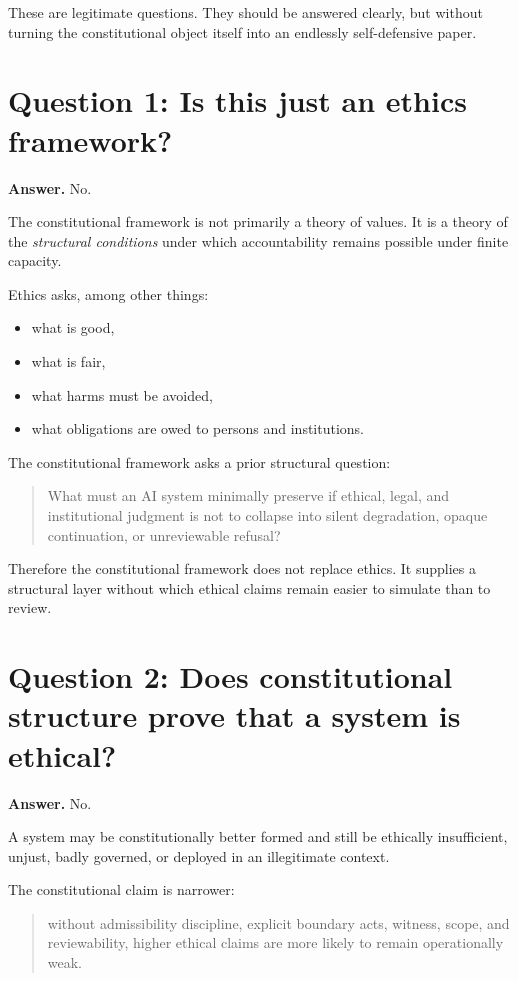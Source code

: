 \documentclass[11pt]{article}
\begin{document}
These are legitimate questions. They should be answered clearly, but without turning the constitutional object itself into an endlessly self-defensive paper.

\section{Question 1: Is this just an ethics framework?}

\textbf{Answer.} No.

The constitutional framework is not primarily a theory of values. It is a theory of the \emph{structural conditions} under which accountability remains possible under finite capacity.

Ethics asks, among other things:
\begin{itemize}[leftmargin=2em]
    \item what is good,
    \item what is fair,
    \item what harms must be avoided,
    \item what obligations are owed to persons and institutions.
\end{itemize}

The constitutional framework asks a prior structural question:
\begin{quote}
What must an AI system minimally preserve if ethical, legal, and institutional judgment is not to collapse into silent degradation, opaque continuation, or unreviewable refusal?
\end{quote}

Therefore the constitutional framework does not replace ethics. It supplies a structural layer without which ethical claims remain easier to simulate than to review.

\section{Question 2: Does constitutional structure prove that a system is ethical?}

\textbf{Answer.} No.

A system may be constitutionally better formed and still be ethically insufficient, unjust, badly governed, or deployed in an illegitimate context.

The constitutional claim is narrower:
\begin{quote}
without admissibility discipline, explicit boundary acts, witness, scope, and reviewability, higher ethical claims are more likely to remain operationally weak.
\end{quote}
\end{document}
